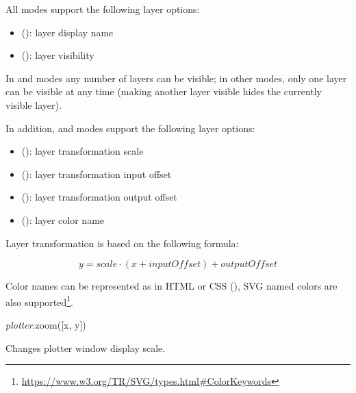 \documentclass[a4paper,12pt,twoside,extrafontsizes]{memoir}
\begin{document}
\begin{funcremarks}
	All modes support the following layer options:
	
	\begin{itemize}
		\item {} (): layer display name
		\item {} (): layer visibility
	\end{itemize}
	
	In  and  modes any number of layers can be visible; in other modes, only one layer can be visible at any time (making another layer visible hides the currently visible layer).
	
	In addition,  and  modes support the following layer options:
	
	\begin{itemize}
		\item {} (): layer transformation scale
		\item {} (): layer transformation input offset
		\item {} (): layer transformation output offset
		\item {} (): layer color name
	\end{itemize}

	Layer transformation is based on the following formula:
	
\begin{displaymath}
y = \mathit{scale} \cdot (x + \mathit{inputOffset}) + \mathit{outputOffset}
\end{displaymath}
	
	Color names can be represented as in HTML or CSS (), SVG named colors are also supported\footnote{\url{https://www.w3.org/TR/SVG/types.html\#ColorKeywords}}.
\end{funcremarks}


\begin{luafuncprototype}
\emph{plotter}.zoom([x, y])
\end{luafuncprototype}

\begin{funcdescr}
	Changes plotter window display scale.
\end{funcdescr}
\end{document}
